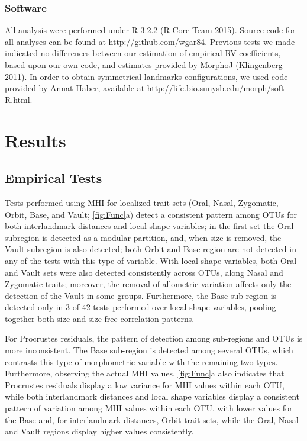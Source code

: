 \documentclass[12pt,]{article}
\begin{document}
\subsubsection{Software}\label{software}

All analysis were performed under R 3.2.2 (R Core Team 2015). Source
code for all analyses can be found at \url{http://github.com/wgar84}.
Previous tests we made indicated no differences between our estimation
of empirical RV coefficients, based upon our own code, and estimates
provided by MorphoJ (Klingenberg 2011). In order to obtain symmetrical
landmarks configurations, we used code provided by Annat Haber,
available at \url{http://life.bio.sunysb.edu/morph/soft-R.html}.

\section{Results}\label{results}

\subsection{Empirical Tests}\label{empirical-tests}

Tests performed using MHI for localized trait sets (Oral, Nasal,
Zygomatic, Orbit, Base, and Vault; \autoref{fig:Func}a) detect a
consistent pattern among OTUs for both interlandmark distances and local
shape variables; in the first set the Oral subregion is detected as a
modular partition, and, when size is removed, the Vault subregion is
also detected; both Orbit and Base region are not detected in any of the
tests with this type of variable. With local shape variables, both Oral
and Vault sets were also detected consistently across OTUs, along Nasal
and Zygomatic traits; moreover, the removal of allometric variation
affects only the detection of the Vault in some groups. Furthermore, the
Base sub-region is detected only in 3 of 42 tests performed over local
shape variables, pooling together both size and size-free correlation
patterns.

For Procrustes residuals, the pattern of detection among sub-regions and
OTUs is more inconsistent. The Base sub-region is detected among several
OTUs, which contrasts this type of morphometric variable with the
remaining two types. Furthermore, observing the actual MHI values,
\autoref{fig:Func}a also indicates that Procrustes residuals display a
low variance for MHI values within each OTU, while both interlandmark
distances and local shape variables display a consistent pattern of
variation among MHI values within each OTU, with lower values for the
Base and, for interlandmark distances, Orbit trait sets, while the Oral,
Nasal and Vault regions display higher values consistently.
\end{document}
